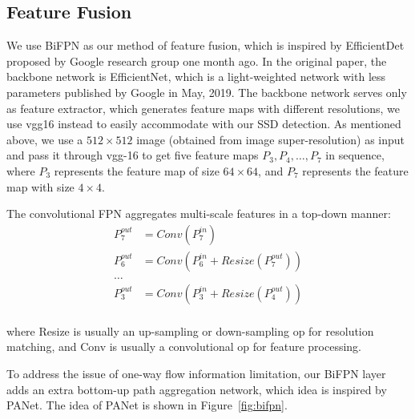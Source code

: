 \documentclass[journal,conference]{IEEEtran}
\begin{document}
\subsection{Feature Fusion}
We use BiFPN as our method of feature fusion, which is inspired by EfficientDet \cite{EfficientDet} proposed by Google research group one month ago. In the original paper, the backbone network is EfficientNet, which is a light-weighted network with less parameters published by Google in May, 2019. The backbone network serves only as feature extractor, which generates feature maps with different resolutions, we use vgg16 instead to easily accommodate with our SSD detection. As mentioned above, we use a $512\times 512$ image (obtained from image super-resolution) as input and pass it through vgg-16 to get five feature maps $P_3,P_4,\ldots,P_7$ in sequence, where $P_3$ represents the feature map of size $64\times 64$, and $P_7$ represents the feature map with size $4\times 4$.

The convolutional FPN aggregates multi-scale features in a top-down manner:
\begin{align*}
  P_7^{out} & =Conv(P_7^{in})                   \\
  P_6^{out} & =Conv(P_6^{in}+Resize(P_7^{out})) \\
  \ldots    &                                   \\
  P_3^{out} & =Conv(P_3^{in}+Resize(P_4^{out})) \\
\end{align*}

where Resize is usually an up-sampling or down-sampling op for resolution matching, and Conv is usually a convolutional op for feature processing.

To address the issue of one-way flow information limitation, our BiFPN layer adds an extra bottom-up path aggregation network, which idea is inspired by PANet. The idea of PANet is shown in Figure~\ref{fig:bifpn}.
\end{document}

